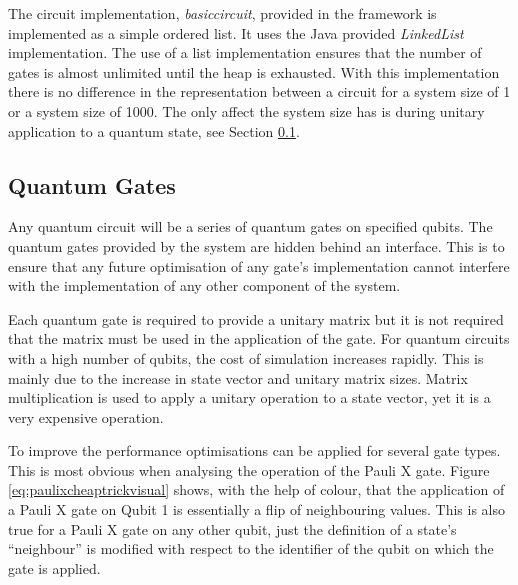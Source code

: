 The circuit implementation, \emph{basiccircuit}, provided in the framework is implemented as a simple ordered list.
It uses the Java provided \emph{LinkedList} implementation.
The use of a list implementation ensures that the number of gates is almost unlimited until the heap is exhausted.
With this implementation there is no difference in the representation between a circuit for a system size of 1 or a system size of 1000.
The only affect  the system size has is during unitary application to a quantum state, see Section \ref{sec:quantumgates}.

\subsection{Quantum Gates}
\label{sec:quantumgates}
Any quantum circuit will be a series of quantum gates on specified qubits.
The quantum gates provided by the system are hidden behind an interface.
This is to ensure that any future optimisation of any gate's implementation cannot interfere with the implementation of any other component of the system.

Each quantum gate is required to provide a unitary matrix but it is not required that the matrix must be used in the application of the gate.
For quantum circuits with a high number of qubits, the cost of simulation increases rapidly.
This is mainly due to the increase in state vector and unitary matrix sizes.
Matrix multiplication is used to apply a unitary operation to a state vector, yet it is a very expensive operation.

To improve the performance optimisations can be applied for several gate types.
This is most obvious when analysing the operation of the Pauli X gate.
Figure \ref{eq:paulixcheaptrickvisual} shows, with the help of colour, that the application of a Pauli X gate on Qubit 1 is essentially a flip of neighbouring values.
This is also true for a Pauli X gate on any other qubit, just the definition of a state's ``neighbour'' is modified with respect to the identifier of the qubit on which the gate is applied.

\newcommand{\myunit}{0.5 cm}
\tikzset{
    node style ge/.style={circle,minimum size=\myunit},
}

